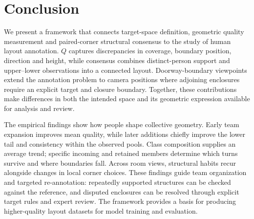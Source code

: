 \section{Conclusion}

We present a framework that connects target-space definition, geometric quality measurement and paired-corner structural consensus to the study of human layout annotation. $Q$ captures discrepancies in coverage, boundary position, direction and height, while consensus combines distinct-person support and upper--lower observations into a connected layout. Doorway-boundary viewpoints extend the annotation problem to camera positions where adjoining enclosures require an explicit target and closure boundary. Together, these contributions make differences in both the intended space and its geometric expression available for analysis and review.

The empirical findings show how people shape collective geometry. Early team expansion improves mean quality, while later additions chiefly improve the lower tail and consistency within the observed pools. Class composition supplies an average trend; specific incoming and retained members determine which turns survive and where boundaries fall. Across room views, structural habits recur alongside changes in local corner choices. These findings guide team organization and targeted re-annotation: repeatedly supported structures can be checked against the reference, and disputed enclosures can be resolved through explicit target rules and expert review. The framework provides a basis for producing higher-quality layout datasets for model training and evaluation.
